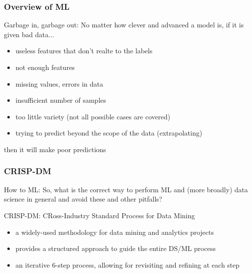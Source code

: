 \documentclass{beamer}
\begin{document}
\begin{frame}	
	\frametitle{Overview of ML}
	
	\begin{block}{Garbage in, garbage out:}
		No matter how clever and advanced a model is, if it is given bad data...
		\begin{itemize}
			\item useless features that don't realte to the labels
			\item not enough features
			\item missing values, errors in data
			\item insufficient number of samples
			\item too little variety (not all possible cases are covered)
			\item trying to predict beyond the scope of the data (extrapolating)
		\end{itemize}
		then it will make poor predictions
		
	\end{block}
	
\end{frame}

\begin{frame}
	\frametitle{CRISP-DM}
	
	\begin{block}{How to ML:}
		So, what is the correct way to perform ML and (more broadly) data science in general and avoid these and other pitfalls?
		
		\vspace{10pt}
		CRISP-DM: CRoss-Industry Standard Process for Data Mining
		\begin{itemize}
			\item a widely-used methodology for data mining and analytics projects
			\item provides a structured approach to guide the entire DS/ML process
			\item an iterative 6-step process, allowing for revisiting and refining at each step
		\end{itemize}
	\end{block}
	
\end{frame}
\end{document}
